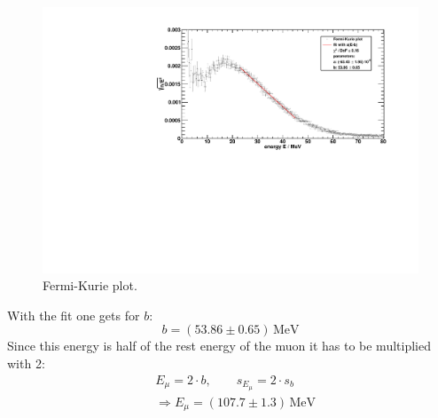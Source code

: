 \begin{figure}[H]
\begin{center}
  \includegraphics[width=\textwidth]{../img/betaspectrum_FermiKurie_fit.pdf}
  \caption{Fermi-Kurie plot.}
  \label{img:beta:fermikuriefit}
\end{center}
\end{figure}
With the fit one gets for $b$:
\begin{equation}
    b = (53.86 \pm 0.65)\,\text{MeV}
\end{equation}
Since this energy is half of the rest energy of the muon it has to be multiplied with 2:
\begin{equation}
\begin{split}
    & E_\mu = 2 \cdot b, \qquad s_{E_\mu} = 2 \cdot s_b \\
    & \Rightarrow E_\mu = (107.7 \pm 1.3)\,\text{MeV}
    \end{split}
\end{equation}

